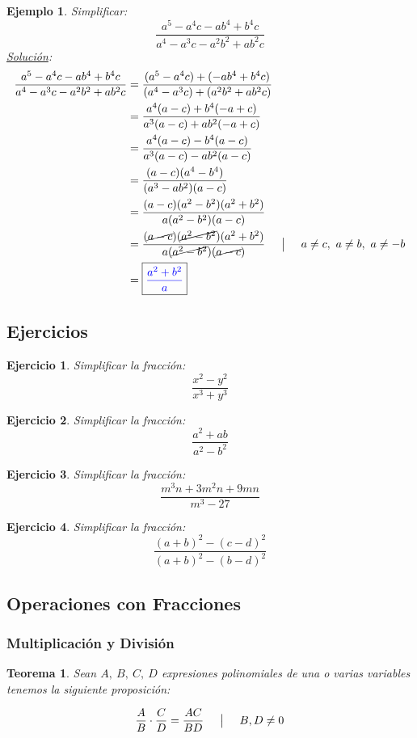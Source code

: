 \documentclass[A4paper, 10pt, oneside]{book}
\newtheorem{theorem}{Teorema}[chapter]
\newtheorem{example}{Ejemplo}[chapter]
\newtheorem{exercise}{Ejercicio}[chapter]
\begin{document}
		\begin{example}
			Simplificar: $$\frac{a^5-a^4c-ab^4+b^4c}{a^4-a^3c-a^2b^2+ab^2c}$$
			\underline{Solución}:
			\begin{align*}
				\frac{a^5-a^4c-ab^4+b^4c}{a^4-a^3c-a^2b^2+ab^2c} &= \frac{(a^5-a^4c)+(-ab^4+b^4c)}{(a^4-a^3c)+(a^2b^2+ab^2c)}\\
				&=\frac{a^4(a-c)+b^4(-a+c)}{a^3(a-c)+ab^2(-a+c)}\\
				&=\frac{a^4(a-c)-b^4(a-c)}{a^3(a-c)-ab^2(a-c)}\\
				&=\frac{(a-c)(a^4-b^4)}{(a^3-ab^2)(a-c)}\\
				&=\frac{(a-c)(a^2-b^2)(a^2+b^2)}{a(a^2-b^2)(a-c)}\\
				&=\frac{(\cancel{a-c})(\cancel{a^2-b^2})(a^2+b^2)}{a(\cancel{a^2-b^2})(\cancel{a-c})} \hspace{5mm} \big| \hspace{5mm} a\neq c, \ a\neq b, \ a\neq -b\\
				&=\fbox{\color{blue}{$\displaystyle{\frac{a^2+b^2}{a}}$}}
			\end{align*}
		\end{example}
	
		\subsection*{Ejercicios}
		
		\begin{multicols}{2}
			\begin{exercise}
				Simplificar la fracción:
				$$\frac{x^2-y^2}{x^3+y^3}$$
			\end{exercise}
			\begin{exercise}
				Simplificar la fracción:
				$$\frac{a^2+ab}{a^2-b^2}$$
			\end{exercise}
			\begin{exercise}
				Simplificar la fracción:
				$$\frac{m^3n+3m^2n+9mn}{m^3-27}$$
			\end{exercise}
			\begin{exercise}
				Simplificar la fracción:
				$$\frac{(a+b)^2-(c-d)^2}{(a+b)^2-(b-d)^2}$$
			\end{exercise}
		\end{multicols}
	
	\subsection{Operaciones con Fracciones}
	\subsubsection{Multiplicación y División}
	\begin{theorem}
		\label{TeoMultF}
		Sean $A, \ B, \ C, \ D$ expresiones polinomiales de una o varias variables tenemos la siguiente proposición: 
		
		$$\frac{A}{B}\cdot \frac{C}{D} = \frac{AC}{BD} \hspace{5mm} \big| \hspace{5mm} B, D \neq 0$$
	\end{theorem}
\end{document}
